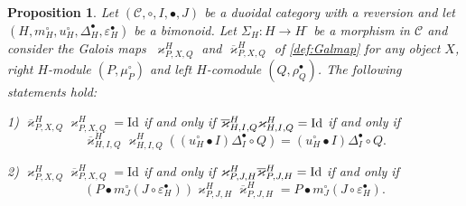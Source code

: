\documentclass[nosumlimits,twoside]{amsart}
\newtheorem{proposition}[proposition]{\sc Proposition}
\theoremstyle{definition}
\theoremstyle{remark}
\newcommand{\rd}[1]{{\color{red}{#1}}}
\newcommand{\as}[1]{{\color{blue}{#1}}}
\newcommand{\Cc}{\mathcal{C}}
\begin{document}
\begin{proposition}%
\label{prop:cogal2} Let $\left( \mathcal{C},\circ ,I,\bullet ,J\right) $ be
a duoidal category with a reversion and let $\left( H,m_{H}^{\circ
},u_{H}^{\circ },\Delta _{H}^{\bullet },\varepsilon _{H}^{\bullet }\right) $
be a bimonoid. Let $\Sigma _{H}:H\rightarrow H^{\text{-} }$ be a morphism in $\Cc$
and consider the Galois maps\textbf{\ }$\varkappa _{P,X,Q}^{H}$ and $%
\overline{\varkappa }_{P,X,Q}^{H}$ of \cref{def:Galmap} for any object $X$,
right $H$-module $\left( P,\mu _{P}^{\circ }\right) $ and left $H$-comodule $%
\left( Q,\rho _{Q}^{\bullet }\right)$.
The following statements hold:

1) $\overline{\varkappa }_{P,X,Q}^{H}\varkappa _{P,X,Q}^{H}=\mathrm{Id}$ if
and only if $\overline{\varkappa }_{H,I,Q}^{H}\varkappa _{H,I,Q}^{H}=\mathrm{%
Id}$ if and only if
\begin{equation}
\overline{\varkappa }_{H,I,Q}^{H}\varkappa _{H,I,Q}^{H}\left( \left(
u_{H}^{\circ }\bullet I\right) \Delta _{I}^{\bullet }\circ Q\right) = \left( u_{H}^{\circ }\bullet I\right)
\Delta _{I}^{\bullet }\circ Q.
\label{eq:GalinvGal}
\end{equation}%

2) $\varkappa _{P,X,Q}^{H}\overline{\varkappa }_{P,X,Q}^{H}=\mathrm{Id}$ if
and only if $\varkappa _{P,J,H}^{H}\overline{\varkappa }_{P,J,H}^{H}=\mathrm{%
Id}$ if and only if%
\begin{equation}
\left( P\bullet m_{J}^{\circ }\left( J\circ \varepsilon
_{H}^{\bullet }\right) \right) \varkappa _{P,J,H}^{H}\overline{\varkappa }%
_{P,J,H}^{H}= P\bullet m_{J}^{\circ }\left( J\circ
\varepsilon _{H}^{\bullet }\right) .  \label{eq:GalGalinv}
\end{equation}
\end{proposition}
\end{document}
